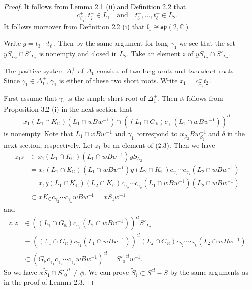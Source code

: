 \documentclass[12pt,a4paper]{amsart}
\def\frak{\mathfrak}
\theoremstyle{definition}
\theoremstyle{remark}
\numberwithin{equation}{section}
\def\br{\mathbb R}
\def\bc{\mathbb C}
\def\mand{\quad\mbox{and}\quad}
\begin{document}
\begin{proof}
It follows from Lemma 2.1 (ii) and Definition 2.2 that
$$c_{\beta_1}^\pm,t_2^\pm\in L_1\mand t_3^\pm,\ldots, t_\ell^\pm\in L_2.$$
It follows moreover from Definition 2.2 (i) that $\frak{l}_1\cong \frak{sp}(2,\bc)$.

Write $y=t_3^-\cdots t_\ell^-$. Then by the same argument for long $\gamma_1$ we see that the set $yS_{L_2}\cap S'_{L_2}$ is nonempty and closed in $L_2$. Take an element $z$ of $yS_{L_2}\cap S'_{L_2}$.

The positive system $\Delta_1^+$ of $\Delta_1$ consists of two long roots and two short roots. Since $\gamma_1\in \Delta_1^+$, $\gamma_1$ is either of these two short roots. Write $x_1=c_{\beta_1}^-t_2^-$.

First assume that $\gamma_1$ is the simple short root of $\Delta_1^+$. Then it follows from Proposition 3.2 (i) in the next section that
\begin{equation}
x_1(L_1\cap K_\bc)(L_1\cap wBw^{-1})\cap ((L_1\cap G_\br)c_{\gamma_1}(L_1\cap wBw^{-1}))^{cl} \tag{2.3}
\end{equation}
is nonempty. Note that $L_1\cap wBw^{-1}$ and $\gamma_1$ correspond to $w_{\beta_2}Bw_{\beta_2}^{-1}$ and $\delta$ in the next section, respectively. Let $z_1$ be an element of (2.3). Then we have
\begin{align*}
z_1z &\in x_1(L_1\cap K_\bc)(L_1\cap wBw^{-1})yS_{L_2} \\
&=x_1(L_1\cap K_\bc)(L_1\cap wBw^{-1})y(L_2\cap K_\bc)c_{\gamma_2}\cdots c_{\gamma_k}(L_2\cap wBw^{-1}) \\
&=x_1y(L_1\cap K_\bc)(L_2\cap K_\bc)c_{\gamma_2}\cdots c_{\gamma_k}(L_1\cap wBw^{-1})(L_2\cap wBw^{-1}) \\
&\subset xK_\bc c_{\gamma_2}\cdots c_{\gamma_k}wBw^{-1}=x\widetilde{S}_1w^{-1}
\end{align*}
and
\begin{align*}
z_1z &\in ((L_1\cap G_\br)c_{\gamma_1}(L_1\cap wBw^{-1}))^{cl} S'_{L_2} \\
&= ((L_1\cap G_\br)c_{\gamma_1}(L_1\cap wBw^{-1}))^{cl} (L_2\cap G_\br)c_{\gamma_2}\cdots c_{\gamma_k}(L_2\cap wBw^{-1}) \\
&\subset (G_\br c_{\gamma_1}c_{\gamma_2}\cdots c_{\gamma_k}wBw^{-1})^{cl}={S'_0}^{cl}w^{-1}.
\end{align*}
So we have $x\widetilde{S}_1\cap {S'_0}^{cl}\ne\phi$. We can prove $\widetilde{S}_1\subset S^{cl}-S$ by the same arguments as in the proof of Lemma 2.3.


\end{proof}
\end{document}
